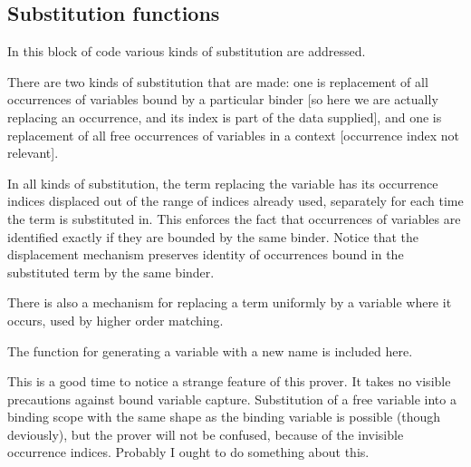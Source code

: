 \documentclass{article}
\begin{document}
\subsection{Substitution functions}

In this block of code various kinds of substitution are addressed.

There are two kinds of substitution that are made:  one is replacement of all occurrences of variables bound
by a particular binder [so here we are actually replacing an occurrence, and its index is part of the data supplied], and one is replacement of all free occurrences of variables in a context [occurrence index not relevant].

In all kinds of substitution, the term replacing the variable has its occurrence indices displaced out of the range of indices already used, separately for each time the term is substituted in.  This enforces the fact that occurrences of variables are identified exactly if they are bounded by the same binder.  Notice that the displacement mechanism
preserves identity of occurrences bound in the substituted term by the same binder.

There is also a mechanism for replacing a term uniformly by a variable where it occurs, used by higher order matching.

The function for generating a variable with a new name is included here.

This is a good time to notice a strange feature of this prover.  It takes no visible precautions against bound variable capture.  Substitution of a free variable into a binding scope with the same shape as the binding variable is possible (though deviously),   but the prover will not be confused, because of the invisible occurrence indices. Probably I ought to do something about this.
\end{document}

